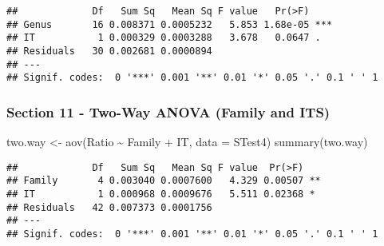 \documentclass[
]{article}
\newenvironment{Shaded}{\begin{snugshade}}{\end{snugshade}}
\newcommand{\AttributeTok}[1]{\textcolor[rgb]{0.77,0.63,0.00}{#1}}
\newcommand{\FunctionTok}[1]{\textcolor[rgb]{0.00,0.00,0.00}{#1}}
\newcommand{\NormalTok}[1]{#1}
\newcommand{\OtherTok}[1]{\textcolor[rgb]{0.56,0.35,0.01}{#1}}
\newcommand{\SpecialCharTok}[1]{\textcolor[rgb]{0.00,0.00,0.00}{#1}}
\begin{document}
\begin{verbatim}
##             Df   Sum Sq   Mean Sq F value   Pr(>F)    
## Genus       16 0.008371 0.0005232   5.853 1.68e-05 ***
## IT           1 0.000329 0.0003288   3.678   0.0647 .  
## Residuals   30 0.002681 0.0000894                     
## ---
## Signif. codes:  0 '***' 0.001 '**' 0.01 '*' 0.05 '.' 0.1 ' ' 1
\end{verbatim}

\hypertarget{section-11---two-way-anova-family-and-its}{%
\subsubsection{Section 11 - Two-Way ANOVA (Family and
ITS)}\label{section-11---two-way-anova-family-and-its}}

\begin{Shaded}
\begin{Highlighting}[]
\NormalTok{two.way }\OtherTok{\textless{}{-}} \FunctionTok{aov}\NormalTok{(Ratio }\SpecialCharTok{\textasciitilde{}}\NormalTok{ Family }\SpecialCharTok{+}\NormalTok{ IT, }\AttributeTok{data =}\NormalTok{ STest4)}
\FunctionTok{summary}\NormalTok{(two.way)}
\end{Highlighting}
\end{Shaded}

\begin{verbatim}
##             Df   Sum Sq   Mean Sq F value  Pr(>F)   
## Family       4 0.003040 0.0007600   4.329 0.00507 **
## IT           1 0.000968 0.0009676   5.511 0.02368 * 
## Residuals   42 0.007373 0.0001756                   
## ---
## Signif. codes:  0 '***' 0.001 '**' 0.01 '*' 0.05 '.' 0.1 ' ' 1
\end{verbatim}
\end{document}
